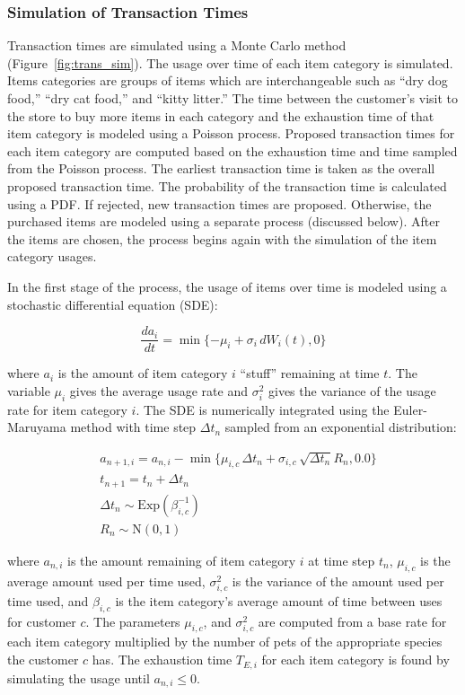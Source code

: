 \documentclass[conference]{IEEEtran}
\begin{document}
\subsubsection{Simulation of Transaction Times} \label{sec:transaction-times}
Transaction times are simulated using a Monte Carlo method (Figure~\ref{fig:trans_sim}).  The usage over time of each item category is simulated. Items categories are groups of items which are interchangeable such as ``dry dog food,'' ``dry cat food,'' and ``kitty litter.'' The time between the customer's visit to the store to buy more items in each category and the exhaustion time of that item category is modeled using a Poisson process. Proposed transaction times for each item category are computed based on the exhaustion time and time sampled from the Poisson process. The earliest transaction time is taken as the overall proposed transaction time.  The probability of the transaction time is calculated using a PDF.  If rejected, new transaction times are proposed.  Otherwise, the purchased items are modeled using a separate process (discussed below). After the items are chosen, the process begins again with the simulation of the item category usages.

In the first stage of the process, the usage of items over time is modeled using a stochastic differential equation (SDE):

\begin{equation*}
\frac{da_i}{dt} = \min \{-\mu_i + \sigma_i\, dW_i(t), 0\}
\end{equation*}

where $a_i$ is the amount of item category $i$ ``stuff'' remaining at time $t$. The variable $\mu_i$ gives the average usage rate and $\sigma^2_i$ gives the variance of the usage rate for item category $i$. The SDE is numerically integrated using the Euler-Maruyama method\cite{Klouden13} with time step $\Delta t_n$ sampled from an exponential distribution:

\begin{align*}
&a_{n+1, i} = a_{n,i} - \min \{\mu_{i, c} \, \Delta t_n + \sigma_{i, c} \, \sqrt{\Delta t_n} R_n, 0.0\} \\
&t_{n+1} = t_n + \Delta t_n \\
&\Delta t_n \sim \text{Exp}(\beta^{-1}_{i,c}) \\
&R_n \sim \text{N}(0, 1)
\end{align*}

where $a_{n, i}$ is the amount remaining of item category $i$ at time step $t_n$, $\mu_{i,c}$ is the average amount used per time used, $\sigma^2_{i,c}$ is the variance of the amount used per time used, and $\beta_{i,c}$ is the item category's average amount of time between uses for customer $c$.  The parameters $\mu_{i, c}$, and $\sigma^2_{i,c}$ are computed from a base rate for each item category multiplied by the number of pets of the appropriate species the customer $c$ has.  The exhaustion time $T_{E,i}$ for each item category is found by simulating the usage until $a_{n,i} \leq 0$.
\end{document}
